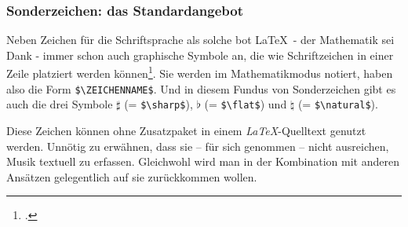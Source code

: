 %
%
%



\subsubsection{Sonderzeichen: das Standardangebot}

Neben Zeichen für die Schriftsprache als solche bot \LaTeX\ - der
Mathematik sei Dank - immer schon auch graphische Symbole an, die wie
Schriftzeichen in einer Zeile platziert werden können\footcite[vgl.][543ff et
passim]{MitGoo2005a}. Sie werden im Mathematikmodus notiert, haben also die Form
\texttt{\small \$\textbackslash{ZEICHENNAME}\$}. Und in diesem Fundus von Sonderzeichen
gibt es auch die drei Symbole $\sharp$ (= \texttt{\small \$\textbackslash{sharp}\$}),
$\flat$ (= \texttt{\small \$\textbackslash{flat}\$}) und $\natural$ (=
\texttt{\small \$\textbackslash{natural}\$}).

Diese Zeichen können ohne Zusatzpaket in einem \emph{LaTeX}-Quelltext genutzt
werden. Unnötig zu erwähnen, dass sie -- für sich genommen -- nicht ausreichen,
Musik textuell zu erfassen. Gleichwohl wird man in der Kombination mit anderen
Ansätzen gelegentlich auf sie zurückkommen wollen.

%
